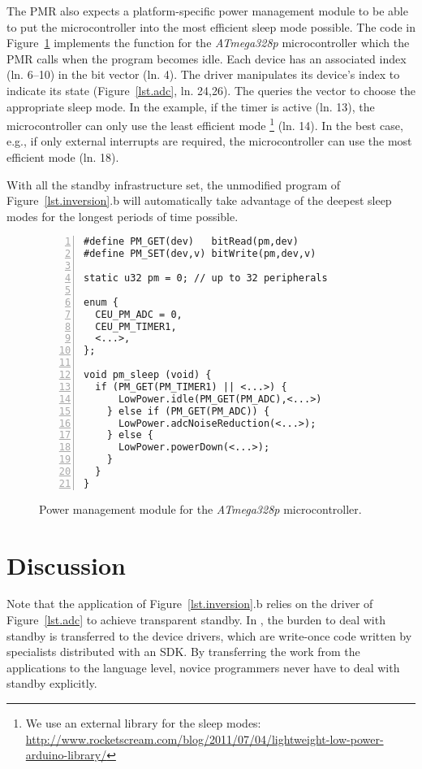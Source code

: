 The PMR also expects a platform-specific power management module to be able to
put the microcontroller into the most efficient sleep mode possible.
%
The code in Figure~\ref{lst.pm} implements the  function for
the \emph{ATmega328p} microcontroller which the PMR calls when the program
becomes idle.
%
Each device has an associated index (ln. 6--10) in the  bit vector
(ln. 4).
%
The driver manipulates its device's index to indicate its state
(Figure~\ref{lst.adc}, ln. 24,26).
%
The  queries the vector to choose the appropriate sleep mode.
In the example, if the timer is active (ln. 13), the microcontroller can only
use the least efficient mode%
\footnote{
    We use an external library for the sleep modes:
    \url{http://www.rocketscream.com/blog/2011/07/04/lightweight-low-power-arduino-library/}
}
(ln. 14).
%
In the best case, e.g., if only external interrupts are required, the
microcontroller can use the most efficient mode (ln. 18).

With all the standby infrastructure set, the unmodified program of
Figure~\ref{lst.inversion}.b will automatically take advantage of the deepest
sleep modes for the longest periods of time possible.

\begin{figure}[t]
\begin{lstlisting}[numbers=left]
#define PM_GET(dev)   bitRead(pm,dev)
#define PM_SET(dev,v) bitWrite(pm,dev,v)

static u32 pm = 0; // up to 32 peripherals

enum {
  CEU_PM_ADC = 0,
  CEU_PM_TIMER1,
  <...>,
};

void pm_sleep (void) {
  if (PM_GET(PM_TIMER1) || <...>) {
      LowPower.idle(PM_GET(PM_ADC),<...>)
    } else if (PM_GET(PM_ADC)) {
      LowPower.adcNoiseReduction(<...>);
    } else {
      LowPower.powerDown(<...>);
    }
  }
}
\end{lstlisting}
\caption{ Power management module for the \emph{ATmega328p} microcontroller.
\label{lst.pm}
}
\end{figure}

\section{Discussion}

Note that the application of Figure~\ref{lst.inversion}.b relies on the driver
of Figure~\ref{lst.adc} to achieve transparent standby.
%
In \CEU, the burden to deal with standby is transferred to the device drivers,
which are write-once code written by specialists distributed with an SDK.
By transferring the work from the applications to the language level, novice
programmers never have to deal with standby explicitly.

